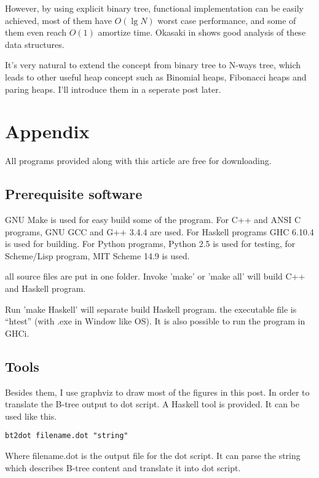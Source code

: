 \documentclass{article}
\begin{document}
However, by using explicit binary tree, functional implementation
can be easily achieved, most of them have $O(\lg N)$ worst case 
performance, and some of them even reach $O(1)$ amortize time.
Okasaki in \cite{okasaki-book} shows good analysis of these data
structures.

It's very natural to extend the concept from binary tree to
N-ways tree, which leads to other useful heap concept such as
Binomial heaps, Fibonacci heaps and paring heaps. I'll introduce
them in a seperate post later.

\section{Appendix} \label{appendix}
All programs provided along with this article are free for
downloading.

\subsection{Prerequisite software}
GNU Make is used for easy build some of the program. For C++ and ANSI C programs,
GNU GCC and G++ 3.4.4 are used. 
For Haskell programs GHC 6.10.4 is used
for building. For Python programs, Python 2.5 is used for testing, for
Scheme/Lisp program, MIT Scheme 14.9 is used.

all source files are put in one folder. Invoke 'make' or 'make all'
will build C++ and Haskell program. 

Run 'make Haskell' will separate build Haskell program. the executable
file is ``htest'' (with .exe
in Window like OS). It is also possible to run the program in GHCi.

\subsection{Tools}

Besides them, I use graphviz to draw most of the figures in this post. In order to
translate the B-tree output to dot script. A Haskell tool is provided.
It can be used like this.

\begin{verbatim}
bt2dot filename.dot "string"
\end{verbatim}

Where filename.dot is the output file for the dot script. It can
parse the string which describes B-tree content and translate it 
into dot script.
\end{document}
